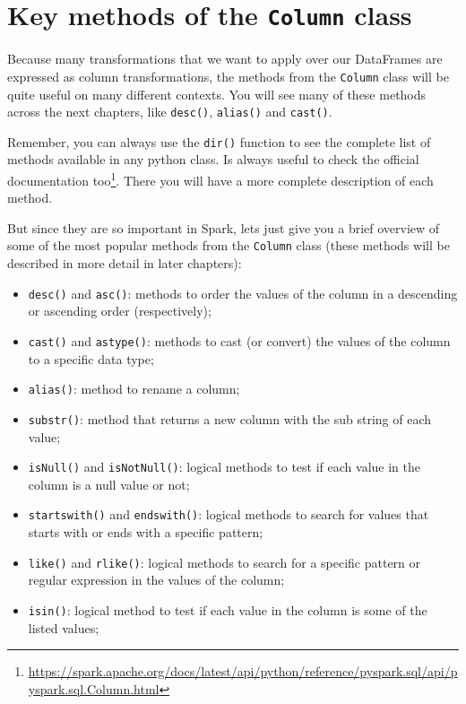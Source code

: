 \documentclass[
  11pt,
  letterpaper,
  DIV=11,
  numbers=noendperiod]{scrreprt}
\providecommand{\tightlist}{%
  \setlength{\itemsep}{0pt}\setlength{\parskip}{0pt}}\usepackage{longtable,booktabs,array}
\begin{document}
\hypertarget{key-methods-of-the-column-class}{%
\section{\texorpdfstring{Key methods of the \texttt{Column}
class}{Key methods of the Column class}}\label{key-methods-of-the-column-class}}

Because many transformations that we want to apply over our DataFrames
are expressed as column transformations, the methods from the
\texttt{Column} class will be quite useful on many different contexts.
You will see many of these methods across the next chapters, like
\texttt{desc()}, \texttt{alias()} and \texttt{cast()}.

Remember, you can always use the \texttt{dir()} function to see the
complete list of methods available in any python class. Is always useful
to check the official documentation too\footnote{\url{https://spark.apache.org/docs/latest/api/python/reference/pyspark.sql/api/pyspark.sql.Column.html}}.
There you will have a more complete description of each method.

But since they are so important in Spark, lets just give you a brief
overview of some of the most popular methods from the \texttt{Column}
class (these methods will be described in more detail in later
chapters):

\begin{itemize}
\tightlist
\item
  \texttt{desc()} and \texttt{asc()}: methods to order the values of the
  column in a descending or ascending order (respectively);
\item
  \texttt{cast()} and \texttt{astype()}: methods to cast (or convert)
  the values of the column to a specific data type;
\item
  \texttt{alias()}: method to rename a column;
\item
  \texttt{substr()}: method that returns a new column with the sub
  string of each value;
\item
  \texttt{isNull()} and \texttt{isNotNull()}: logical methods to test if
  each value in the column is a null value or not;
\item
  \texttt{startswith()} and \texttt{endswith()}: logical methods to
  search for values that starts with or ends with a specific pattern;
\item
  \texttt{like()} and \texttt{rlike()}: logical methods to search for a
  specific pattern or regular expression in the values of the column;
\item
  \texttt{isin()}: logical method to test if each value in the column is
  some of the listed values;
\end{itemize}
\end{document}
